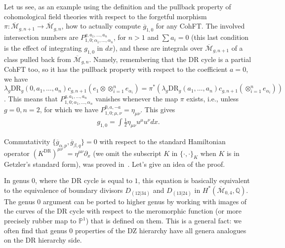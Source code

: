 \documentclass[pdftex]{sigma}
\numberwithin{equation}{section}
\newcommand{\mbP}{\mathbb P}
\newcommand{\oM}{\overline{\mathcal M}}
\newcommand{\og}{\overline g}
\def\mbQ{{\mathbb Q}}
\def\d{{\partial}}
\newcommand{\<}{\left<}
\renewcommand{\>}{\right>}
\newcommand{\DR}{\mathrm{DR}}
\begin{document}
\begin{Remark}Let us see, as an example using the def\/inition and the pullback property of cohomological f\/ield theories with respect to the forgetful morphism $\pi\colon \oM_{g,n+1}\to \oM_{g,n}$, how to actually compute $\og_{1,0}$ for any CohFT. The involved intersection numbers are $P_{1,0;\alpha_1,\dots,\alpha_n}^{g,a_1,\dots,a_n}$, for $n>1$ and $\sum a_i = 0$ (this last condition is the ef\/fect of integrating $g_{1,0}$ in $dx$), and these are integrals over $\oM_{g,n+1}$ of a class pulled back from $\oM_{g,n}$. Namely, remembering that the DR cycle is a partial CohFT too, so it has the pullback property with respect to the coef\/f\/icient $a=0$, we have $\lambda_g \DR_g(0,a_1,\dots,a_n)c_{g,n+1}(e_1\otimes \otimes_{i=1}^n e_{\alpha_i}) = \pi^* (\lambda_g \DR_g(a_1,\dots,a_n) c_{g,n+1}(\otimes_{i=1}^n e_{\alpha_i}))$. This means that $P_{1,0;\alpha_1,\dots,\alpha_n}^{g,a_1,\dots,a_n}$ vanishes whenever the map $\pi$ exists, i.e., unless $g=0, n=2$, for which we have $P_{1,0;\mu,\nu}^{0,a,-a} = \eta_{\mu \nu}$. This gives
\begin{gather}\label{eq:string}
g_{1,0} = \int \frac{1}{2}\eta_{\mu \nu} u^\mu u^\nu dx.
\end{gather}
\end{Remark}

Commutativity $\{\og_{\alpha,p},\og_{\beta,q}\}=0$ with respect to the standard Hamiltonian operator $(K^\DR)^{\mu \nu}$ $=\eta^{\mu \nu} \d_x$ (we omit the subscript $K$ in $\{\cdot,\cdot\}_K$ when $K$ is in Getzler's standard form), was proved in~\cite{Bur15}. Let's give an idea of the proof.

In genus $0$, where the DR cycle is equal to $1$, this equation is basically equivalent to the equivalence of boundary divisors $D_{(12|34)}$ and $D_{(13|24)}$ in $H^*(\oM_{0,4},\mbQ)$. The genus $0$ argument can be ported to higher genus by working with images of the curves of the DR cycle with respect to the meromorphic function (or more precisely rubber map to $\mbP^1$) that is def\/ined on them. This is a general fact: we often f\/ind that genus $0$ properties of the DZ hierarchy have all genera analogues on the DR hierarchy side.
\end{document}
